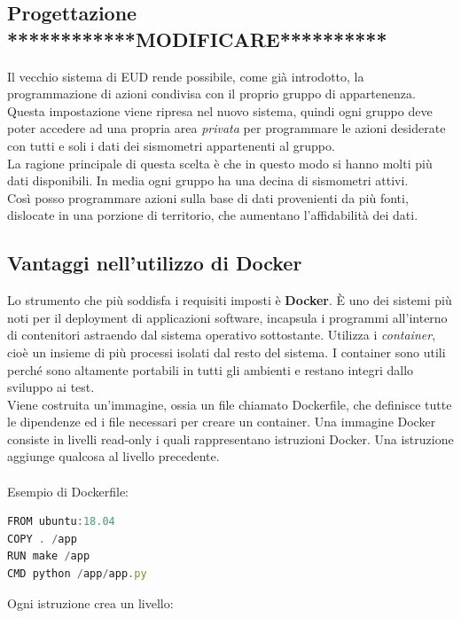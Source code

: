 \documentclass[a4paper,10pt]{memoir}
\begin{document}
\subsection{Progettazione ************MODIFICARE**********}
Il vecchio sistema di EUD rende possibile, come già introdotto, la programmazione di azioni condivisa con il proprio gruppo di appartenenza.
\\
Questa impostazione viene ripresa nel nuovo sistema, quindi ogni gruppo deve poter accedere ad una propria area \textit{privata} per programmare le azioni desiderate con tutti e soli i dati dei sismometri appartenenti al gruppo.
\\
La ragione principale di questa scelta è che in questo modo si hanno molti più dati disponibili. In media ogni gruppo ha una decina di sismometri attivi.
\\
Così posso programmare azioni sulla base di dati provenienti da più fonti, dislocate in una porzione di territorio, che aumentano l'affidabilità dei dati.

\clearpage

\subsection{Vantaggi nell'utilizzo di Docker}

Lo strumento che più soddisfa i requisiti imposti è \textbf{Docker}.
È uno dei sistemi più noti per il deployment di applicazioni software, incapsula i programmi all'interno di contenitori astraendo dal sistema operativo sottostante.
Utilizza i \textit{container}, cioè un insieme di più processi isolati dal resto del sistema.
I container sono utili perché sono altamente portabili in tutti gli ambienti e restano integri dallo sviluppo ai test.
\\
Viene costruita un'immagine, ossia un file chiamato Dockerfile, che definisce tutte le dipendenze ed i file necessari per creare un container.
Una immagine Docker consiste in livelli read-only i quali rappresentano istruzioni Docker. Una istruzione aggiunge qualcosa al livello precedente.
\\
\\
Esempio di Dockerfile:
\begin{lstlisting}[language=Javascript]
FROM ubuntu:18.04
COPY . /app
RUN make /app
CMD python /app/app.py
\end{lstlisting}

Ogni istruzione crea un livello:
\end{document}
